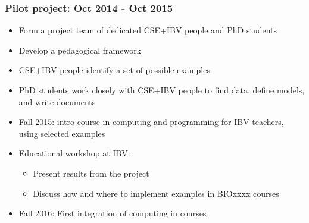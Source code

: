 \documentclass{beamer}
\begin{document}
\begin{frame}
\frametitle{Pilot project: Oct 2014 - Oct 2015}

\begin{block}{}
\begin{itemize}
 \item Form a project team of dedicated CSE+IBV people and  PhD students

 \item Develop a pedagogical framework

 \item CSE+IBV people identify a set of possible examples

 \item PhD students work closely with CSE+IBV people to find data,
   define models, and write documents

 \item Fall 2015: intro course in computing and programming for IBV teachers, using selected examples

 \item Educational workshop at IBV:
\begin{itemize}

   \item Present results from the project

   \item Discuss how and where to implement examples in BIOxxxx courses

\end{itemize}

\noindent
 \item Fall 2016: First integration of computing in courses
\end{itemize}

\noindent
\end{block}
\end{frame}
\end{document}
